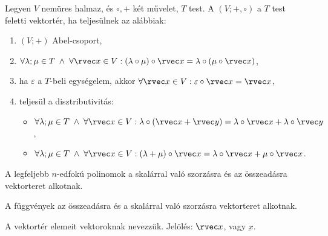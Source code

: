 \begin{definition}[Vektortér]
  Legyen $V$ nemüres halmaz, és $\circ, +$ két művelet, $T$ test.
  A $(V; +, \circ)$ a $T$ test feletti vektortér, ha teljesülnek az alábbiak:
  \begin{enumerate}
    \item $(V; +)$ Abel-csoport,

    \item $\forall \lambda; \mu \in T \; \land \; \forall \rvec x \in V:
            (\lambda \circ \mu) \circ \rvec x
            = \lambda \circ (\mu \circ \rvec x)$,

    \item ha $\varepsilon$ a $T$-beli egységelem, akkor
          $\forall \rvec x \in V: \varepsilon \circ \rvec x = \rvec x$,

    \item teljesül a disztributivitás:
          \begin{itemize}
            \item $\forall \lambda; \mu \in T \; \land \; \forall \rvec x \in V:
                    \lambda \circ (\rvec x + \rvec y)
                    = \lambda \circ \rvec x + \lambda \circ \rvec y$,

            \item $\forall \lambda; \mu \in T \; \land \; \forall \rvec x \in V:
                    (\lambda + \mu) \circ \rvec x
                    = \lambda \circ \rvec x + \mu \circ \rvec x$.
          \end{itemize}
  \end{enumerate}
\end{definition}

\begin{example}
  A legfeljebb $n$-edfokú polinomok a skalárral való szorzásra és az összeadásra
  vektorteret alkotnak.

  A függvények az összeadásra és a skalárral való szorzásra vektorteret alkotnak.
\end{example}

\begin{definition}[Vektor]
  A vektortér elemeit vektoroknak nevezzük.
  Jelölés: $\rvec x$, vagy $\underbar x$.
\end{definition}

